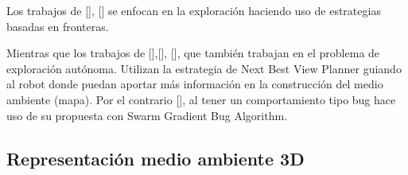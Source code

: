 

Los trabajos de \citeauthor{CIESLEWSKI2017}[], \citeauthor{BARTOLOMEI2023}[] se enfocan en la exploración haciendo uso de estrategias basadas en fronteras.

Mientras que los trabajos de \citeauthor{PAPACHRISTOS2017}[],\citeauthor{SELIN2019}[], \citeauthor{RACER2022}[], que también trabajan en el problema de exploración autónoma. Utilizan la estrategia de Next Best View Planner guiando al robot donde puedan aportar más información en la construcción del medio ambiente (mapa). Por el contrario \citeauthor{BUG2019}[], al tener un comportamiento tipo bug hace uso de su propuesta con Swarm Gradient Bug Algorithm.

\subsection{Representación medio ambiente 3D}


